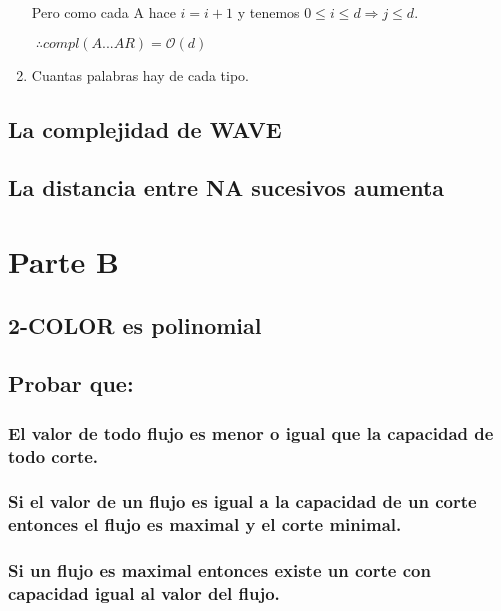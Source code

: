 \documentclass[12pt,a4paper]{report}
\begin{document}
\begin{enumerate}
		Pero como cada A hace $ i = i+1$ y tenemos $ 0 \leq \textit{i} \leq \textit{d} \Rightarrow \textit{j} \leq \textit{d}.$
		
		\begin{center}
			$ \; \therefore compl(A...AR) = \mathcal{O}(\textit{d})$
		\end{center}			
			

			\item Cuantas palabras hay de cada tipo.
			
				
		\end{enumerate}
		
		
		
		
		
		
		
	\section{La complejidad de WAVE}

	
	\section{La distancia entre NA sucesivos aumenta}
	


\chapter{Parte B}

	\section{2-COLOR es polinomial}
	
	
	\section{Probar que:}
	
		\subsection{El valor de todo flujo es menor o igual que la capacidad de todo corte.}
		
		\subsection{Si el valor de un flujo es igual a la capacidad de un corte entonces el flujo es maximal y el corte minimal.}
		
		\subsection{Si un flujo es maximal entonces existe un corte con capacidad igual al valor del flujo.}
	
\end{document}
